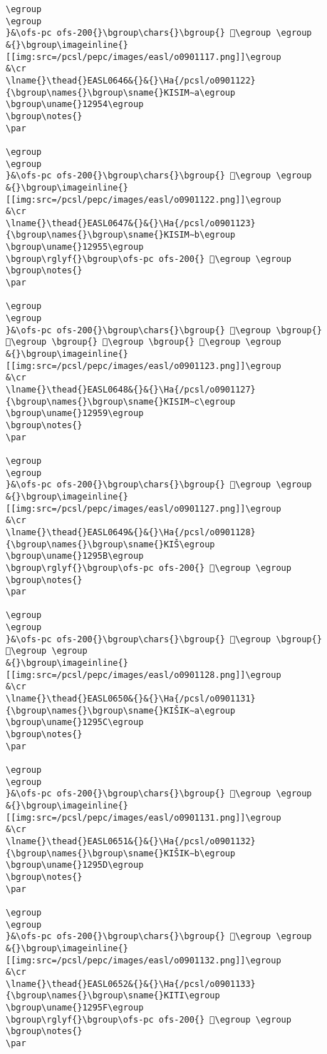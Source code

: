 \begin{verbatim}
\egroup
\egroup
}&\ofs-pc ofs-200{}\bgroup\chars{}\bgroup{} 𒥓\egroup \egroup
&{}\bgroup\imageinline{}[[img:src=/pcsl/pepc/images/easl/o0901117.png]]\egroup
&\cr
\lname{}\thead{}EASL0646&{}&{}\Ha{/pcsl/o0901122}{\bgroup\names{}\bgroup\sname{}KISIM∼a\egroup
\bgroup\uname{}12954\egroup
\bgroup\notes{}
\par 

\egroup
\egroup
}&\ofs-pc ofs-200{}\bgroup\chars{}\bgroup{} 𒥔\egroup \egroup
&{}\bgroup\imageinline{}[[img:src=/pcsl/pepc/images/easl/o0901122.png]]\egroup
&\cr
\lname{}\thead{}EASL0647&{}&{}\Ha{/pcsl/o0901123}{\bgroup\names{}\bgroup\sname{}KISIM∼b\egroup
\bgroup\uname{}12955\egroup
\bgroup\rglyf{}\bgroup\ofs-pc ofs-200{} 𒥕\egroup \egroup
\bgroup\notes{}
\par 

\egroup
\egroup
}&\ofs-pc ofs-200{}\bgroup\chars{}\bgroup{} 𒥕\egroup \bgroup{} 𒥖\egroup \bgroup{} 𒥗\egroup \bgroup{} 𒥘\egroup \egroup
&{}\bgroup\imageinline{}[[img:src=/pcsl/pepc/images/easl/o0901123.png]]\egroup
&\cr
\lname{}\thead{}EASL0648&{}&{}\Ha{/pcsl/o0901127}{\bgroup\names{}\bgroup\sname{}KISIM∼c\egroup
\bgroup\uname{}12959\egroup
\bgroup\notes{}
\par 

\egroup
\egroup
}&\ofs-pc ofs-200{}\bgroup\chars{}\bgroup{} 𒥙\egroup \egroup
&{}\bgroup\imageinline{}[[img:src=/pcsl/pepc/images/easl/o0901127.png]]\egroup
&\cr
\lname{}\thead{}EASL0649&{}&{}\Ha{/pcsl/o0901128}{\bgroup\names{}\bgroup\sname{}KIŠ\egroup
\bgroup\uname{}1295B\egroup
\bgroup\rglyf{}\bgroup\ofs-pc ofs-200{} 𒥛\egroup \egroup
\bgroup\notes{}
\par 

\egroup
\egroup
}&\ofs-pc ofs-200{}\bgroup\chars{}\bgroup{} 𒥚\egroup \bgroup{} 𒥛\egroup \egroup
&{}\bgroup\imageinline{}[[img:src=/pcsl/pepc/images/easl/o0901128.png]]\egroup
&\cr
\lname{}\thead{}EASL0650&{}&{}\Ha{/pcsl/o0901131}{\bgroup\names{}\bgroup\sname{}KIŠIK∼a\egroup
\bgroup\uname{}1295C\egroup
\bgroup\notes{}
\par 

\egroup
\egroup
}&\ofs-pc ofs-200{}\bgroup\chars{}\bgroup{} 𒥜\egroup \egroup
&{}\bgroup\imageinline{}[[img:src=/pcsl/pepc/images/easl/o0901131.png]]\egroup
&\cr
\lname{}\thead{}EASL0651&{}&{}\Ha{/pcsl/o0901132}{\bgroup\names{}\bgroup\sname{}KIŠIK∼b\egroup
\bgroup\uname{}1295D\egroup
\bgroup\notes{}
\par 

\egroup
\egroup
}&\ofs-pc ofs-200{}\bgroup\chars{}\bgroup{} 𒥝\egroup \egroup
&{}\bgroup\imageinline{}[[img:src=/pcsl/pepc/images/easl/o0901132.png]]\egroup
&\cr
\lname{}\thead{}EASL0652&{}&{}\Ha{/pcsl/o0901133}{\bgroup\names{}\bgroup\sname{}KITI\egroup
\bgroup\uname{}1295F\egroup
\bgroup\rglyf{}\bgroup\ofs-pc ofs-200{} 𒥟\egroup \egroup
\bgroup\notes{}
\par 


\end{verbatim}
